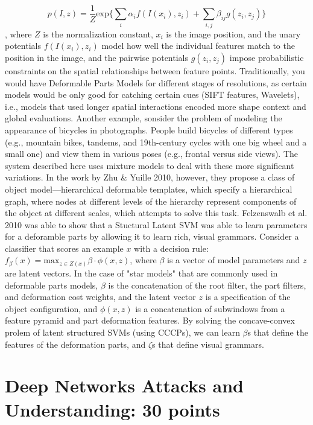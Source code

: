 \documentclass[10pt,onecolumn,letterpaper]{article}
\begin{document}
\begin{enumerate}
$$ p(I,z) = \frac{1}{Z}\text{exp}\{\sum_i\alpha_if(I(x_i),z_i) + \sum_{i,j}\beta_{ij}g(z_i,z_j)\} $$, where $Z$ is the normalization constant, $x_i$ is the image position, and the unary potentials $f(I(x_i), z_i)$ model how well the individual features match to the position in the image, and the pairwise potentials $g(z_i,z_j)$ impose probabilistic constraints on the spatial relationships between feature points. Traditionally, you would have Deformable Parts Models for different stages of resolutions, as certain models would be only good for catching certain cues (SIFT features, Wavelets), i.e., models that used longer spatial interactions encoded more shape context and global evaluations. Another example, sonsider the problem of modeling the appearance of bicycles in photographs. People build bicycles of different types (e.g., mountain bikes, tandems, and 19th-century cycles with one big wheel and a small one) and view
them in various poses (e.g., frontal versus side views). The system described here uses mixture models to deal with these more significant variations. In the work by Zhu \& Yuille 2010, however, they propose a class of object model—hierarchical deformable templates, which specify a hierarchical graph, where nodes at different levels of the hierarchy represent components of the object at different scales, which attempts to solve this task. Felzenswalb et al. 2010 was able to show that a Stuctural Latent SVM was able to learn parameters for a deforamble parts by allowing it to learn rich, visual grammars. Consider a classifier that scores an example $x$ with a decision rule: $f_\beta(x) = \text{max}_{z \in Z(x)} \beta \cdot \phi (x,z)$, where $\beta$ is a vector of model parameters and $z$ are latent vectors. In the case of "star models" that are commonly used in deformable parts models, $\beta$ is the concatenation of the root filter, the part filters, and deformation cost weights, and the latent vector $z$ is a specification of the object configuration, and $\phi(x,z)$ is a concatenation of subwindows from a feature pyramid and part deformation features. By solving the concave-convex prolem of latent structured SVMs (using CCCPs), we can learn $\beta$s that define the features of the deformation parts, and $\zeta$s that define visual grammars.



\end{enumerate}

\section*{Deep Networks Attacks and Understanding: 30 points}
\end{document}
